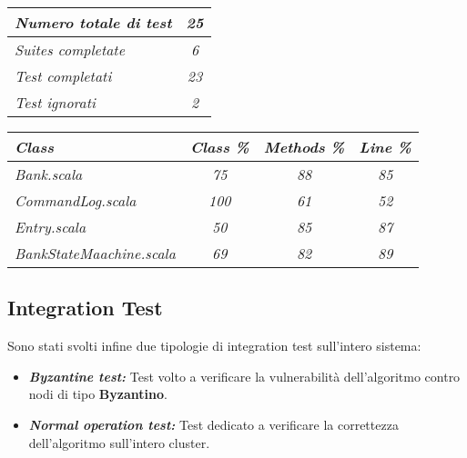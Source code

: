   \begin{center}
    \begin{tcolorbox}[title=\em{Risultati Test},hbox,    %
       lifted shadow={1mm}{-2mm}{3mm}{0.1mm}%
       {black!50!white}]
        \begin{tabular}{ |lc|}
          \hline
          \emph{Numero totale di test}  & \em{25}\\ 
          \hline
          \emph{Suites completate}      & \em{6}\\ 
          \hline
          \em{Test completati}          & \em{23}\\
          \hline
          \em{Test ignorati}            & \em{2}\\  
          \hline
        \end{tabular}
      \end{tcolorbox}
  \end{center}

  \begin{center}
    \begin{tcolorbox}[title=\em{Coverage},hbox,    %
       lifted shadow={1mm}{-2mm}{3mm}{0.1mm}%
       {black!50!white}]
        \begin{tabular}{ |lccc|}
        \hline
          \em{\textbf{Class}}           & \em{\textbf{Class \%}}  & \em{\textbf{Methods \%}}  & \em{\textbf{Line \%}} \\ 
          \hline
          \emph{Bank.scala}             & \em{75}                & \em{88}                  & \em{85}                 \\ 
          \hline
          \emph{CommandLog.scala}       & \em{100}               & \em{61}                  & \em{52}                 \\
          \hline
          \em{Entry.scala}              & \em{50}                & \em{85}                  & \em{87}                 \\
          \hline
          \em{BankStateMaachine.scala}  & \em{69}                & \em{82}                  & \em{89}                 \\
          \hline
        \end{tabular}
      \end{tcolorbox}
  \end{center}

  \subsection{Integration Test}
  Sono stati svolti infine due tipologie di integration test sull'intero sistema: 
  \begin{itemize}
    \item{\textbf{\emph{Byzantine test:}}}
    Test volto a verificare la vulnerabilità dell'algoritmo contro nodi di tipo \textbf{Byzantino}.   
    \item{\textbf{\emph{Normal operation test:}}}
    Test dedicato a verificare la correttezza dell'algoritmo sull'intero cluster.
  \end{itemize}